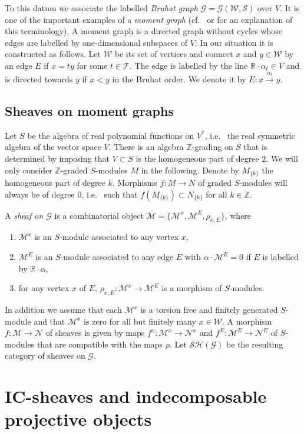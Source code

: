 \documentclass[12pt]{amsart}
\theoremstyle{definition}
\theoremstyle{remark}
\newcommand{\CG}{{\mathcal G}}
\newcommand{\CS}{{\mathcal S}}
\newcommand{\CT}{{\mathcal T}}
\newcommand{\CW}{{\mathcal W}}
\newcommand{\SM}{{\mathscr M}}
\newcommand{\SN}{{\mathscr N}}
\newcommand{\DR}{{\mathbb R}}
\newcommand{\DZ}{{\mathbb Z}}
\newcommand{\Sh}{{\mathcal{SH}}}
\begin{document}
To this datum we associate the labelled {\em Bruhat graph} $\CG=\CG(\CW,\CS)$ over $V$. It is one of the important examples of a {\em moment graph} (cf.~ \cite[1.2]{BMP} or \cite[1.2]{GKM} for an explanation of this terminology).  A moment graph is a directed graph without cycles whose edges are labelled by one-dimensional subspaces of $V$. In our situation it is constructed as follows. Let $\CW$ be its set of vertices  and connect $x$ and $y\in\CW$ by an edge $E$ if $x=ty$ for some $t\in\CT$. The edge is labelled by the line  $\DR\cdot \alpha_t\in V$ and is directed towards $y$ if $x<y$ in the Bruhat order. We denote it by $E\colon x\stackrel{\alpha_t}\to y$. 

\subsection{Sheaves on moment graphs}

Let $S$ be the algebra of real polynomial functions on $V^\ast$, i.e.~ the real symmetric algebra of the vector space $V$. There is an algebra $\DZ$-grading on $S$ that is determined by imposing that $V\subset S$ is the homogeneous part of degree $2$. We will only consider $\DZ$-graded $S$-modules $M$ in the following. Denote by $M_{\{k\}}$ the homogeneous part of degree $k$. Morphisms $f\colon M\to N$ of graded $S$-modules will always be of degree $0$, i.e.~ such that $f(M_{\{k\}})\subset N_{\{k\}}$ for all $k\in\DZ$.  

A {\em sheaf on $\CG$} is a combinatorial object $\SM=\{\SM^x,\SM^E,\rho_{x,E}\}$, where
\begin{enumerate}
\item $\SM^x$ is an $S$-module associated to any vertex $x$,
\item $\SM^E$ is an $S$-module associated to any edge $E$ with $\alpha\cdot \SM^E=0$ if $E$ is labelled by $\DR\cdot \alpha$,
\item for any vertex $x$ of $E$, $\rho_{x,E}\colon\SM^x\to\SM^E$ is a morphism of $S$-modules.
\end{enumerate}
In addition we assume that each $\SM^x$ is a torsion free and finitely generated $S$-module and that $\SM^x$ is zero for all but finitely many $x\in\CW$. A morphism $f\colon \SM\to\SN$ of sheaves is given by maps $f^x\colon \SM^x\to\SN^x$ and $f^E\colon\SM^E\to\SN^E$ of $S$-modules that are compatible with the maps $\rho$. Let $\Sh(\CG)$ be the resulting category of sheaves on $\CG$.


\section{IC-sheaves and indecomposable projective objects}
\end{document}
